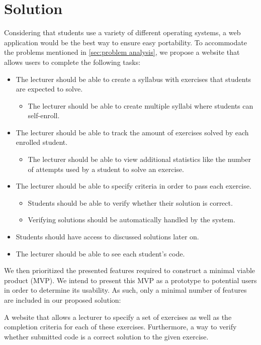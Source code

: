 \section{Solution}
Considering that students use a variety of different operating systems, a web application would be the best way to ensure easy portability.
To accommodate the problems mentioned in \ref{sec:problem analysis}, we propose a website that allows users to complete the following tasks:
\begin{itemize}
	\item The lecturer should be able to create a syllabus with exercises that students are expected to solve.
	\begin{itemize}
		\item The lecturer should be able to create multiple syllabi where students can self-enroll.
	\end{itemize}
	\item The lecturer should be able to track the amount of exercises solved by each enrolled student.
	\begin{itemize}
		\item The lecturer should be able to view additional statistics like the number of attempts used by a student to solve an exercise.
	\end{itemize}
	\item The lecturer should be able to specify criteria in order to pass each exercise.
	\begin{itemize}
		\item Students should be able to verify whether their solution is correct.
		\item Verifying solutions should be automatically handled by the system.
	\end{itemize}
	\item Students should have access to discussed solutions later on.
	\item The lecturer should be able to see each student's code.
\end{itemize}

We then prioritized the presented features required to construct a minimal viable product (MVP).
We intend to present this MVP as a prototype to potential users in order to determine its usability.
As such, only a minimal number of features are included in our proposed solution:

\begin{displayquote}
A website that allows a lecturer to specify a set of exercises as well as the completion criteria for each of these exercises. Furthermore, a way to verify whether submitted code is a correct solution to the given exercise.
\end{displayquote}